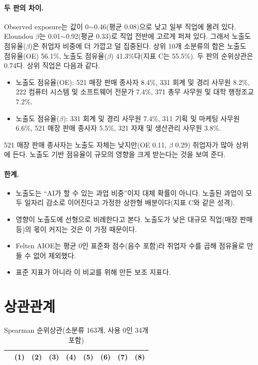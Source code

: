 \documentclass[11pt]{article}
\begin{document}
\paragraph{두 판의 차이.} Observed exposure는 값이 0$\sim$0.46(평균 0.08)으로 낮고 일부 직업에 몰려 있다. Eloundou $\beta$는 0.01$\sim$0.92(평균 0.33)로 직업 전반에 고르게 퍼져 있다. 그래서 노출도 점유율($\beta$)은 취업자 비중에 더 가깝고 덜 집중된다. 상위 10개 소분류의 합은 노출도 점유율(OE) 56.1\%, 노출도 점유율($\beta$) 41.3\%다(지표 C는 55.5\%). 두 판의 순위상관은 0.74다. 상위 직업은 다음과 같다.
\begin{itemize}[leftmargin=*]
  \item 노출도 점유율(OE): 521 매장 판매 종사자 8.4\%, 331 회계 및 경리 사무원 8.2\%, 222 컴퓨터 시스템 및 소프트웨어 전문가 7.4\%, 371 총무 사무원 및 대학 행정조교 7.2\%.
  \item 노출도 점유율($\beta$): 331 회계 및 경리 사무원 7.4\%, 311 기획 및 마케팅 사무원 6.6\%, 521 매장 판매 종사자 5.5\%, 321 자재 및 생산관리 사무원 3.8\%.
\end{itemize}
521 매장 판매 종사자는 노출도 자체는 낮지만(OE 0.11, $\beta$ 0.29) 취업자가 많아 상위에 든다. 노출도 기반 점유율이 규모의 영향을 크게 받는다는 것을 보여 준다.

\paragraph{한계.}
\begin{itemize}[leftmargin=*]
  \item 노출도는 ``AI가 할 수 있는 과업 비중''이지 대체 확률이 아니다. 노출된 과업이 모두 일자리 감소로 이어진다고 가정한 상한형 배분이다(지표 C와 같은 성격).
  \item 영향이 노출도에 선형으로 비례한다고 본다. 노출도가 낮은 대규모 직업(매장 판매 등)의 몫이 커지는 것은 이 가정 때문이다.
  \item Felten AIOE는 평균 0인 표준화 점수(음수 포함)라 취업자 수를 곱해 점유율로 만들 수 없어 제외했다.
  \item 표준 지표가 아니라 이 비교를 위해 만든 보조 지표다.
\end{itemize}

\section{상관관계}

\begin{longtable}{L{4.6cm}R{1.4cm}R{1.4cm}R{1.4cm}R{1.4cm}R{1.4cm}R{1.4cm}R{1.4cm}R{1.4cm}}
\caption{Spearman 순위상관(소분류 163개, 사용 0인 34개 포함)}\label{tab:corr}\\
\toprule
 & (1) & (2) & (3) & (4) & (5) & (6) & (7) & (8) \\
\midrule
\endfirsthead

\bottomrule
\end{longtable}
\end{document}
